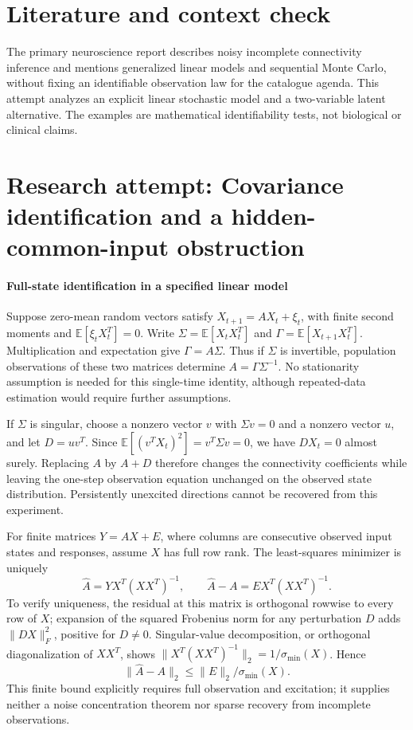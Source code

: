 \documentclass[11pt]{article}
\begin{document}
\section{Literature and context check}
The primary neuroscience report describes noisy incomplete connectivity inference and mentions generalized linear models and sequential Monte Carlo, without fixing an identifiable observation law for the catalogue agenda. This attempt analyzes an explicit linear stochastic model and a two-variable latent alternative. The examples are mathematical identifiability tests, not biological or clinical claims.
\section{Research attempt: Covariance identification and a hidden-common-input obstruction}

\paragraph{Full-state identification in a specified linear model}
Suppose zero-mean random vectors satisfy $X_{t+1}=AX_t+\xi_t$, with finite second moments and $\mathbb E[\xi_tX_t^T]=0$. Write $\Sigma=\mathbb E[X_tX_t^T]$ and $\Gamma=\mathbb E[X_{t+1}X_t^T]$. Multiplication and expectation give $\Gamma=A\Sigma$. Thus if $\Sigma$ is invertible, population observations of these two matrices determine $A=\Gamma\Sigma^{-1}$. No stationarity assumption is needed for this single-time identity, although repeated-data estimation would require further assumptions.

If $\Sigma$ is singular, choose a nonzero vector $v$ with $\Sigma v=0$ and a nonzero vector $u$, and let $D=uv^T$. Since $\mathbb E[(v^TX_t)^2]=v^T\Sigma v=0$, we have $DX_t=0$ almost surely. Replacing $A$ by $A+D$ therefore changes the connectivity coefficients while leaving the one-step observation equation unchanged on the observed state distribution. Persistently unexcited directions cannot be recovered from this experiment.

For finite matrices $Y=AX+E$, where columns are consecutive observed input states and responses, assume $X$ has full row rank. The least-squares minimizer is uniquely
\[
 \widehat A=YX^T(XX^T)^{-1},\qquad
 \widehat A-A=EX^T(XX^T)^{-1}.
\]
To verify uniqueness, the residual at this matrix is orthogonal rowwise to every row of $X$; expansion of the squared Frobenius norm for any perturbation $D$ adds $\lVert DX\rVert_F^2$, positive for $D\ne0$. Singular-value decomposition, or orthogonal diagonalization of $XX^T$, shows $\lVert X^T(XX^T)^{-1}\rVert_2=1/\sigma_{\min}(X)$. Hence
\[
 \lVert\widehat A-A\rVert_2\leq\lVert E\rVert_2/\sigma_{\min}(X).
\]
This finite bound explicitly requires full observation and excitation; it supplies neither a noise concentration theorem nor sparse recovery from incomplete observations.
\end{document}
